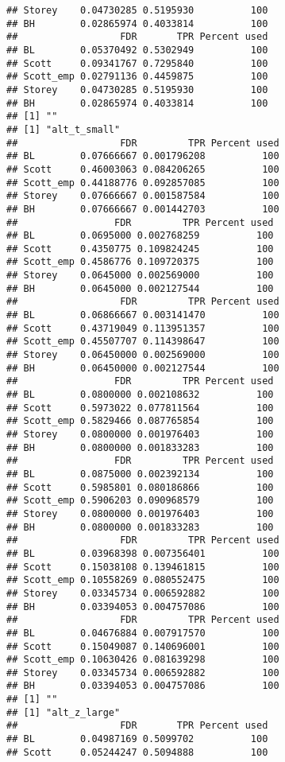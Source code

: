 \documentclass{article}\usepackage[]{graphicx}\usepackage[]{color}
\makeatletter
\newenvironment{kframe}{%
 \def\at@end@of@kframe{}%
 \ifinner\ifhmode%
  \def\at@end@of@kframe{\end{minipage}}%
  \begin{minipage}{\columnwidth}%
 \fi\fi%
 \def\FrameCommand##1{\hskip\@totalleftmargin \hskip-\fboxsep
 \colorbox{shadecolor}{##1}\hskip-\fboxsep
     \hskip-\linewidth \hskip-\@totalleftmargin \hskip\columnwidth}%
 \MakeFramed {\advance\hsize-\width
   \@totalleftmargin\z@ \linewidth\hsize
   \@setminipage}}%
 {\par\unskip\endMakeFramed%
 \at@end@of@kframe}
\newenvironment{knitrout}{}{} %
\makeatother
\begin{document}
\begin{knitrout}
\begin{kframe}
\begin{verbatim}
## Storey    0.04730285 0.5195930          100
## BH        0.02865974 0.4033814          100
##                  FDR       TPR Percent used
## BL        0.05370492 0.5302949          100
## Scott     0.09341767 0.7295840          100
## Scott_emp 0.02791136 0.4459875          100
## Storey    0.04730285 0.5195930          100
## BH        0.02865974 0.4033814          100
## [1] ""
## [1] "alt_t_small"
##                  FDR         TPR Percent used
## BL        0.07666667 0.001796208          100
## Scott     0.46003063 0.084206265          100
## Scott_emp 0.44188776 0.092857085          100
## Storey    0.07666667 0.001587584          100
## BH        0.07666667 0.001442703          100
##                 FDR         TPR Percent used
## BL        0.0695000 0.002768259          100
## Scott     0.4350775 0.109824245          100
## Scott_emp 0.4586776 0.109720375          100
## Storey    0.0645000 0.002569000          100
## BH        0.0645000 0.002127544          100
##                  FDR         TPR Percent used
## BL        0.06866667 0.003141470          100
## Scott     0.43719049 0.113951357          100
## Scott_emp 0.45507707 0.114398647          100
## Storey    0.06450000 0.002569000          100
## BH        0.06450000 0.002127544          100
##                 FDR         TPR Percent used
## BL        0.0800000 0.002108632          100
## Scott     0.5973022 0.077811564          100
## Scott_emp 0.5829466 0.087765854          100
## Storey    0.0800000 0.001976403          100
## BH        0.0800000 0.001833283          100
##                 FDR         TPR Percent used
## BL        0.0875000 0.002392134          100
## Scott     0.5985801 0.080186866          100
## Scott_emp 0.5906203 0.090968579          100
## Storey    0.0800000 0.001976403          100
## BH        0.0800000 0.001833283          100
##                  FDR         TPR Percent used
## BL        0.03968398 0.007356401          100
## Scott     0.15038108 0.139461815          100
## Scott_emp 0.10558269 0.080552475          100
## Storey    0.03345734 0.006592882          100
## BH        0.03394053 0.004757086          100
##                  FDR         TPR Percent used
## BL        0.04676884 0.007917570          100
## Scott     0.15049087 0.140696001          100
## Scott_emp 0.10630426 0.081639298          100
## Storey    0.03345734 0.006592882          100
## BH        0.03394053 0.004757086          100
## [1] ""
## [1] "alt_z_large"
##                  FDR       TPR Percent used
## BL        0.04987169 0.5099702          100
## Scott     0.05244247 0.5094888          100

\end{verbatim}
\end{kframe}
\end{knitrout}
\end{document}
